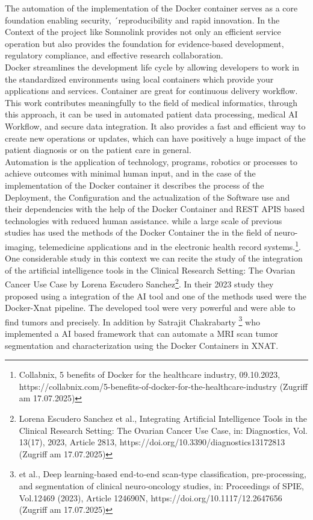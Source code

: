 The automation of the implementation of the Docker container serves as a core foundation enabling security, ´reproducibility and rapid innovation. In the Context of the project like Somnolink provides not only an efficient service operation but also provides the foundation for evidence-based development, regulatory compliance, and effective research collaboration.\\
Docker streamlines the development life cycle by allowing developers to work in the standardized environments using local containers which provide your applications and services. Container are great for continuous delivery workflow.
This work contributes meaningfully to the field of medical informatics, through this approach, it can be used in automated patient data processing, medical AI Workflow, and secure data integration. It also provides a fast and efficient way to create new operations or updates, which can have positively a huge impact of the patient diagnosis or on the patient care in general.\\Automation is the application of technology, programs, robotics or processes to achieve outcomes with minimal human input, and in the case of the implementation of the Docker container it describes the process of the Deployment, the Configuration and the actualization of the Software use and their dependencies with the help of the Docker Container and REST APIS based technologies with reduced human assistance. 
while a large scale of previous studies has used the methods of the Docker Container the  in the field of neuro-imaging, telemedicine applications and in the electronic health record systems.\footnote{Collabnix, 5 benefits of Docker for the healthcare industry, 09.10.2023, https://collabnix.com/5-benefits-of-docker-for-the-healthcare-industry (Zugriff am 17.07.2025)}. One considerable study in this context we can recite the study of the integration of the artificial intelligence tools in the Clinical Research Setting: The Ovarian Cancer Use Case by Lorena Escudero Sanchez\footnote{Lorena Escudero Sanchez et al., Integrating Artificial Intelligence Tools in the Clinical Research Setting: The Ovarian Cancer Use Case, in: Diagnostics, Vol. 13(17), 2023, Article 2813, https://doi.org/10.3390/diagnostics13172813 (Zugriff am 17.07.2025)}. In their 2023 study they proposed using a integration of the AI tool and one of the methods used were the Docker-Xnat pipeline. The developed tool were very powerful and were able to find tumors and precisely. In addition by Satrajit Chakrabarty \footnote{et al., Deep learning‑based end‑to‑end scan‑type classification, pre‑processing, and segmentation of clinical neuro‑oncology studies, in: Proceedings of SPIE, Vol.12469 (2023), Article 124690N, https://doi.org/10.1117/12.2647656 (Zugriff am 17.07.2025)} who implemented a  AI based framework that can automate a MRI scan tumor segmentation and characterization using the Docker Containers in XNAT.\\ 
